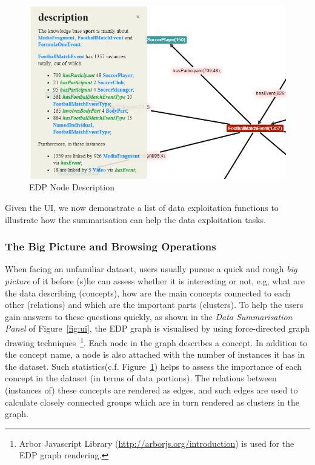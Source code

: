 \begin{figure}
\begin{center}
\includegraphics[scale=0.50]{figures/node.png}
\caption{EDP Node Description}\label{fig:node}
\end{center}
\end{figure}

Given the UI, we now demonstrate a list of data exploitation functions to illustrate how the summarisation can help the data exploitation tasks.
\subsubsection{The Big Picture and Browsing Operations}
When facing an unfamiliar dataset, users usually pursue a quick and rough \emph{big picture} of it before (s)he can assess whether it is interesting or not, e.g, what are the data describing (concepts), how are the main concepts connected to each other (relations) and which are the important parts (clusters). To help the users gain answers to these questions quickly, as shown in the \emph{Data Summarisation Panel} of Figure~\ref{fig:ui}, the EDP graph is visualised by using force-directed graph drawing techniques~\footnote{Arbor Javascript Library (\url{http://arborjs.org/introduction}) is used for the EDP graph rendering.}. Each node in the graph describes a concept. In addition to the concept name, a node is also attached with the number of instances it has in the dataset. Such statistics(c.f. Figure~\ref{fig:node}) helps to assess the importance of each concept in the dataset (in terms of data portions). The relations between (instances of) these concepts are rendered as edges, and such edges are used to calculate closely connected groups which are in turn rendered as clusters in the graph.

